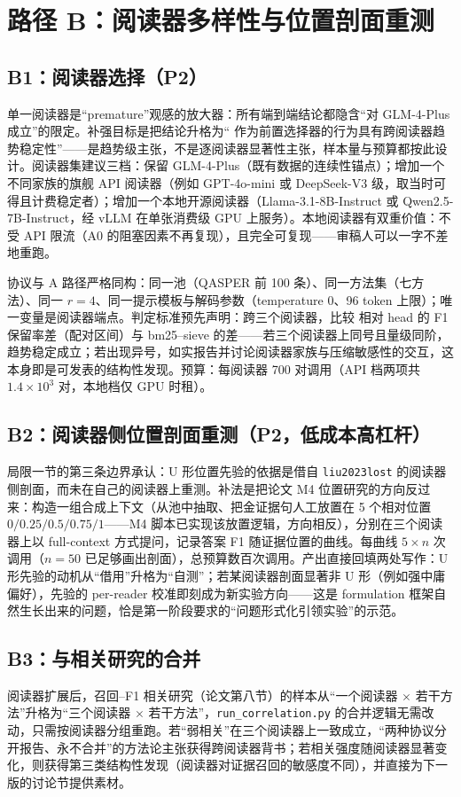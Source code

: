 \section{路径 B：阅读器多样性与位置剖面重测}

\subsection{B1：阅读器选择（P2）}

单一阅读器是``premature''观感的放大器：所有端到端结论都隐含``对 GLM-4-Plus 成立''的限定。补强目标是把结论升格为``\sieve{} 作为前置选择器的行为具有跨阅读器趋势稳定性''——是趋势级主张，不是逐阅读器显著性主张，样本量与预算都按此设计。阅读器集建议三档：保留 GLM-4-Plus（既有数据的连续性锚点）；增加一个不同家族的旗舰 API 阅读器（例如 GPT-4o-mini 或 DeepSeek-V3 级，取当时可得且计费稳定者）；增加一个本地开源阅读器（Llama-3.1-8B-Instruct 或 Qwen2.5-7B-Instruct，经 vLLM 在单张消费级 GPU 上服务）。本地阅读器有双重价值：不受 API 限流（A0 的阻塞因素不再复现），且完全可复现——审稿人可以一字不差地重跑。

协议与 A 路径严格同构：同一池（QASPER 前 100 条）、同一方法集（七方法）、同一 $r{=}4$、同一提示模板与解码参数（temperature 0、96 token 上限）；唯一变量是阅读器端点。判定标准预先声明：跨三个阅读器，比较 \sieve{} 相对 head 的 F1 保留率差（配对区间）与 bm25--sieve 的差——若三个阅读器上同号且量级同阶，趋势稳定成立；若出现异号，如实报告并讨论阅读器家族与压缩敏感性的交互，这本身即是可发表的结构性发现。预算：每阅读器 700 对调用（API 档两项共 $1.4\times10^3$ 对，本地档仅 GPU 时租）。

\subsection{B2：阅读器侧位置剖面重测（P2，低成本高杠杆）}

局限一节的第三条边界承认：U 形位置先验的依据是借自 \texttt{liu2023lost} 的阅读器侧剖面，而未在自己的阅读器上重测。补法是把论文 M4 位置研究的方向反过来：构造一组合成上下文（从池中抽取、把金证据句人工放置在 5 个相对位置 $0/0.25/0.5/0.75/1$——M4 脚本已实现该放置逻辑，方向相反），分别在三个阅读器上以 full-context 方式提问，记录答案 F1 随证据位置的曲线。每曲线 $5\times n$ 次调用（$n{=}50$ 已足够画出剖面），总预算数百次调用。产出直接回填两处写作：U 形先验的动机从``借用''升格为``自测''；若某阅读器剖面显著非 U 形（例如强中庸偏好），先验的 per-reader 校准即刻成为新实验方向——这是 formulation 框架自然生长出来的问题，恰是第一阶段要求的``问题形式化引领实验''的示范。

\subsection{B3：与相关研究的合并}

阅读器扩展后，召回--F1 相关研究（论文第八节）的样本从``一个阅读器 $\times$ 若干方法''升格为``三个阅读器 $\times$ 若干方法''，\texttt{run\_correlation.py} 的合并逻辑无需改动，只需按阅读器分组重跑。若``弱相关''在三个阅读器上一致成立，``两种协议分开报告、永不合并''的方法论主张获得跨阅读器背书；若相关强度随阅读器显著变化，则获得第三类结构性发现（阅读器对证据召回的敏感度不同），并直接为下一版的讨论节提供素材。
